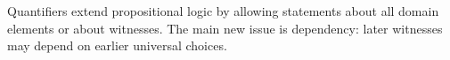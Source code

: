 \begin{remark*}[Exposition]
Quantifiers extend propositional logic by allowing statements about all domain
elements or about witnesses. The main new issue is dependency: later witnesses
may depend on earlier universal choices.
\end{remark*}
